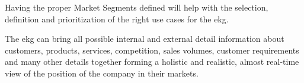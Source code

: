 %
%
\ekgmmHowEKGAffectsThisCapability

Having the proper Market Segments defined will help with the selection, definition and prioritization of
the right use cases for the \gls{ekg}.

\ekgmmHowEKGRequiresThisCapability

The \gls{ekg} can bring all possible internal and external detail information about customers, products, services,
competition, sales volumes, customer requirements and many other details together forming a holistic and realistic,
almost real-time view of the position of the company in their markets.


